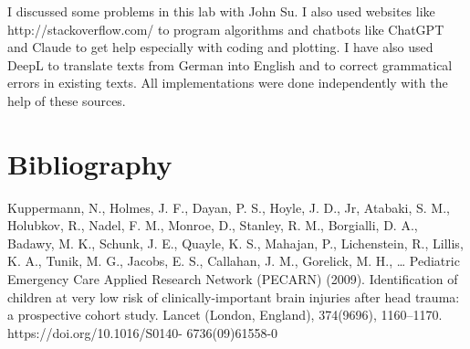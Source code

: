 \documentclass[10pt,letterpaper]{article}
\begin{document}
I discussed some problems in this lab with John Su. I also used websites like http://stackoverflow.com/ to program algorithms and chatbots like ChatGPT and Claude to get help especially with coding and plotting. I have also used DeepL to translate texts from German into English and to correct grammatical errors in existing texts.  All implementations were done independently with the help of these sources.

\section{Bibliography}\label{bibliography}

Kuppermann, N., Holmes, J. F., Dayan, P. S., Hoyle, J. D., Jr, Atabaki, S. M., Holubkov, R., Nadel,
F. M., Monroe, D., Stanley, R. M., Borgialli, D. A., Badawy, M. K., Schunk, J. E., Quayle, K. S.,
Mahajan, P., Lichenstein, R., Lillis, K. A., Tunik, M. G., Jacobs, E. S., Callahan, J. M., Gorelick,
M. H., … Pediatric Emergency Care Applied Research Network (PECARN) (2009). Identification
of children at very low risk of clinically-important brain injuries after head trauma: a prospective
cohort study. Lancet (London, England), 374(9696), 1160–1170. https://doi.org/10.1016/S0140-
6736(09)61558-0
\end{document}
